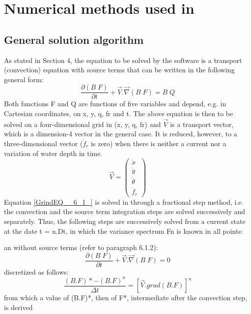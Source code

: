 \chapter{  Numerical methods used in \tomawac}

\section{ General solution algorithm}

 As stated in Section 4, the equation to be solved by the \tomawac software is a transport (convection) equation with source terms that can be written in the following general form:
\begin{equation} \label{GrindEQ__6_1_}
\frac{\partial \left(B\; F\right)}{\partial t} +\vec{V}.\vec{\nabla }\left(B\; F\right)=B\; Q
\end{equation}
Both functions F and Q are functions of five variables and depend, e.g. in Cartesian coordinates, on x, y, q, fr and t. The above equation is then to be solved on a four-dimensional grid in (x, y, q, fr) and $\vec{V}$ is a transport vector, which is a dimension-4 vector in the general case. It is reduced, however, to a three-dimensional vector ($\dot{f}_{r} $ is zero) when there is neither a current nor a variation of water depth in time.
\begin{equation} \label{GrindEQ__6_2_}
\vec{V}=\left(\begin{array}{c} {\dot{x}} \\ {\dot{y}} \\ {\dot{\theta }} \\ {\dot{f}_{r} } \end{array}\right)
\end{equation}
Equation \eqref{GrindEQ__6_1_} is solved in \tomawac through a fractional step method, i.e. the convection and the source term integration steps are solved successively and separately. Thus, the following steps are successively solved from a current state at the date t = n.Dt, in which the variance spectrum Fn is known in all points:

  an \textbf{} without source terms (refer to paragraph 6.1.2):
\begin{equation} \label{GrindEQ__6_3_}
\frac{\partial \left(B\; F\right)}{\partial t} +\vec{V}.\vec{\nabla }\left(B\; F\right)=0
\end{equation}
discretized as follows:
\begin{equation} \label{GrindEQ__6_4_}
\frac{(B.F)*-(B.F)^{n} }{\Delta t} =\left[\vec{V}.grad(B.F)\right]^{n}
\end{equation}
from which a value of (B.F)*, then of F*, intermediate after the convection step, is derived

